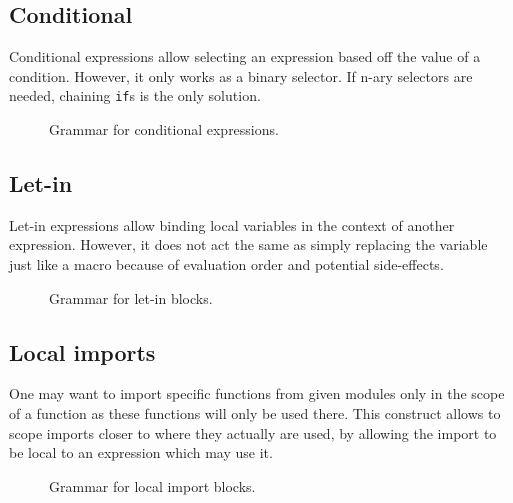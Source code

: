 \subsection{Conditional}\label{subsec:zilch-grammar-expressions-conditional}

Conditional expressions allow selecting an expression based off the value of a condition.
However, it only works as a binary selector.
If n-ary selectors are needed, chaining \texttt{if}s is the only solution.

\begin{figure}[H]
	\centering


	\caption{Grammar for conditional expressions.}
	\label{fig:zilch-gramma-expressions-conditional-grammar}
\end{figure}

\subsection{Let-in}\label{subsec:zilch-grammar-expressions-letin}

Let-in expressions allow binding local variables in the context of another expression.
However, it does not act the same as simply replacing the variable just like a macro because of evaluation order and potential side-effects.

\begin{figure}[H]
	\centering


	\caption{Grammar for let-in blocks.}
	\label{fig:zilch-grammar-expressions-letin-grammar}
\end{figure}

\subsection{Local imports}\label{subsec:zilch-grammar-expressions-import}

One may want to import specific functions from given modules only in the scope of a function as these functions will only be used there.
This construct allows to scope imports closer to where they actually are used, by allowing the import to be local to an expression which may use it.

\begin{figure}[H]
	\centering


	\caption{Grammar for local import blocks.}
	\label{fig:zilch-grammar-expressions-import-grammar}
\end{figure}

